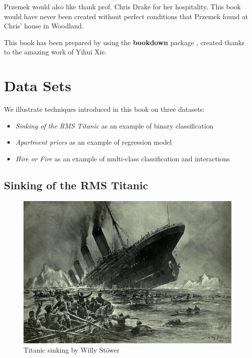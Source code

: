 \documentclass[]{krantz}
\providecommand{\tightlist}{%
  \setlength{\itemsep}{0pt}\setlength{\parskip}{0pt}}
\theoremstyle{definition}
\theoremstyle{definition}
\theoremstyle{definition}
\theoremstyle{remark}
\begin{document}
Przemek would also like thank prof. Chris Drake for her hospitality.
This book would have never been created without perfect conditions that
Przemek found at Chris' house in Woodland.

This book has been prepared by using the \textbf{bookdown} package
\citep{R-bookdown}, created thanks to the amazing work of Yihui Xie.

\hypertarget{DataSetsIntro}{%
\section{Data Sets}\label{DataSetsIntro}}

We illustrate techniques introduced in this book on three datasets:

\begin{itemize}
\tightlist
\item
  \emph{Sinking of the RMS Titanic} as an example of binary
  classification
\item
  \emph{Apartment prices} as an example of regression model
\item
  \emph{Hire or Fire} as an example of multi-class classification and
  interactions
\end{itemize}

\hypertarget{TitanicDataset}{%
\subsection{Sinking of the RMS Titanic}\label{TitanicDataset}}

\begin{figure}
\centering
\includegraphics{figure/Titanic.jpg}
\caption{Titanic sinking by Willy Stöwer}
\end{figure}
\end{document}
